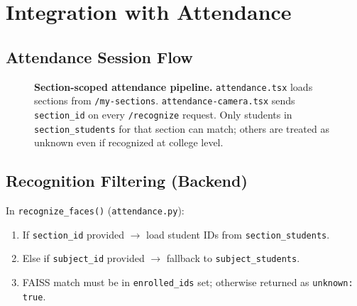 \documentclass[11pt,a4paper,oneside]{report}
\begin{document}
\chapter{Integration with Attendance}
\label{ch:attendance}

\section{Attendance Session Flow}

\begin{figure}[H]
  \centering
  \caption{%
    \textbf{Section-scoped attendance pipeline.}%
    \texttt{attendance.tsx} loads sections from \texttt{/my-sections}. \texttt{attendance-camera.tsx} sends \texttt{section\_id} on every \texttt{/recognize} request. Only students in \texttt{section\_students} for that section can match; others are treated as unknown even if recognized at college level.
  }
  \label{fig:attendance-flow}
\end{figure}

\section{Recognition Filtering (Backend)}

In \texttt{recognize\_faces()} (\texttt{attendance.py}):

\begin{enumerate}[leftmargin=1.5em]
  \item If \texttt{section\_id} provided $\rightarrow$ load student IDs from \texttt{section\_students}.
  \item Else if \texttt{subject\_id} provided $\rightarrow$ fallback to \texttt{subject\_students}.
  \item FAISS match must be in \texttt{enrolled\_ids} set; otherwise returned as \texttt{unknown: true}.
\end{enumerate}
\end{document}
